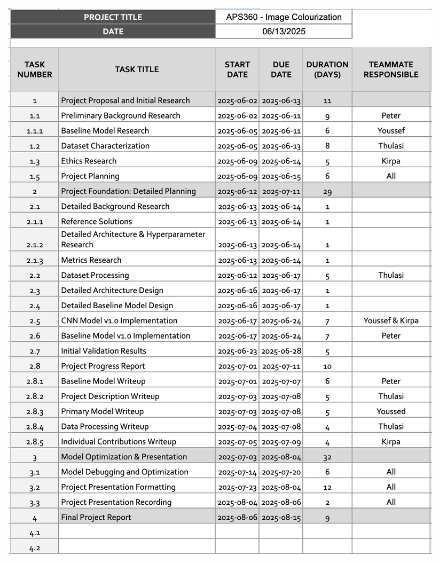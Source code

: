 \documentclass{article} %
\begin{document}
\begin{figure}[ht]
  \centering
  \includegraphics[width=1\linewidth]{Figs/task-names.png}
  \label{fig:task-names}
\end{figure}

\end{document}
